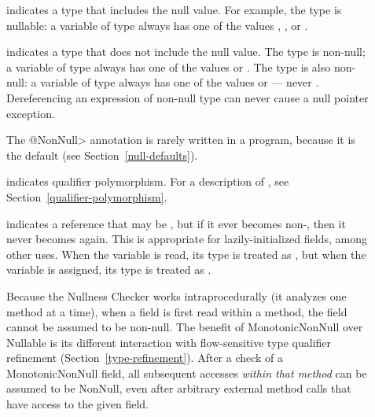 \begin{description}

\item[]
  indicates a type that includes the null value.  For example, the type 
  is nullable:  a variable of type  always has one of the
  values , , or .

\item[]
  indicates a type that does not include the null value.  The type
   is non-null; a variable of type  always has
  one of the values  or .  The type  is also non-null:  a variable of type 
  always has one of the values  or  --- never
  .  Dereferencing an expression of non-null type can never cause
  a null pointer exception.

  The \<@NonNull> annotation is rarely written in a program, because it is
  the default (see Section~\ref{null-defaults}).

\item[]
  indicates qualifier polymorphism.  For a description of
  , see
  Section~\ref{qualifier-polymorphism}.

\item[]
  indicates a reference that may be , but if it ever becomes
  non-, then it never becomes  again.  This is
  appropriate for lazily-initialized fields, among other uses.  When the
  variable is read, its type is treated as
  , but when the variable is
  assigned, its type is treated as
  .

  Because the Nullness Checker works intraprocedurally (it analyzes one
  method at a time), when a  field is first read within a
  method, the field cannot be assumed to be non-null.  The benefit of
  MonotonicNonNull over Nullable is its different interaction with
  flow-sensitive type qualifier refinement (Section~\ref{type-refinement}).
  After a check of a MonotonicNonNull
  field, all subsequent accesses \emph{within that method} can be assumed
  to be NonNull, even after arbitrary external method calls that have
  access to the given field.


\end{description}
